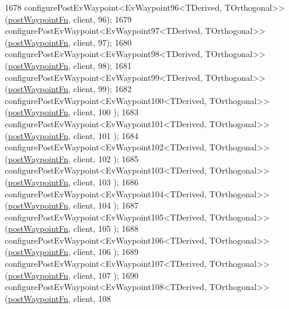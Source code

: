 \begin{DoxyCode}
1678     configurePostEvWaypoint<EvWaypoint96<TDerived, TOrthogonal>>(\hyperlink{classcl__move__base__z_1_1WaypointEventDispatcher_a964a57fcce5d48ec60243230722d8dd7}{postWaypointFn}, client, 96);
1679     configurePostEvWaypoint<EvWaypoint97<TDerived, TOrthogonal>>(\hyperlink{classcl__move__base__z_1_1WaypointEventDispatcher_a964a57fcce5d48ec60243230722d8dd7}{postWaypointFn}, client, 97);
1680     configurePostEvWaypoint<EvWaypoint98<TDerived, TOrthogonal>>(\hyperlink{classcl__move__base__z_1_1WaypointEventDispatcher_a964a57fcce5d48ec60243230722d8dd7}{postWaypointFn}, client, 98);
1681     configurePostEvWaypoint<EvWaypoint99<TDerived, TOrthogonal>>(\hyperlink{classcl__move__base__z_1_1WaypointEventDispatcher_a964a57fcce5d48ec60243230722d8dd7}{postWaypointFn}, client, 99);
1682     configurePostEvWaypoint<EvWaypoint100<TDerived, TOrthogonal>>(\hyperlink{classcl__move__base__z_1_1WaypointEventDispatcher_a964a57fcce5d48ec60243230722d8dd7}{postWaypointFn}, client, 100
      );
1683     configurePostEvWaypoint<EvWaypoint101<TDerived, TOrthogonal>>(\hyperlink{classcl__move__base__z_1_1WaypointEventDispatcher_a964a57fcce5d48ec60243230722d8dd7}{postWaypointFn}, client, 101
      );
1684     configurePostEvWaypoint<EvWaypoint102<TDerived, TOrthogonal>>(\hyperlink{classcl__move__base__z_1_1WaypointEventDispatcher_a964a57fcce5d48ec60243230722d8dd7}{postWaypointFn}, client, 102
      );
1685     configurePostEvWaypoint<EvWaypoint103<TDerived, TOrthogonal>>(\hyperlink{classcl__move__base__z_1_1WaypointEventDispatcher_a964a57fcce5d48ec60243230722d8dd7}{postWaypointFn}, client, 103
      );
1686     configurePostEvWaypoint<EvWaypoint104<TDerived, TOrthogonal>>(\hyperlink{classcl__move__base__z_1_1WaypointEventDispatcher_a964a57fcce5d48ec60243230722d8dd7}{postWaypointFn}, client, 104
      );
1687     configurePostEvWaypoint<EvWaypoint105<TDerived, TOrthogonal>>(\hyperlink{classcl__move__base__z_1_1WaypointEventDispatcher_a964a57fcce5d48ec60243230722d8dd7}{postWaypointFn}, client, 105
      );
1688     configurePostEvWaypoint<EvWaypoint106<TDerived, TOrthogonal>>(\hyperlink{classcl__move__base__z_1_1WaypointEventDispatcher_a964a57fcce5d48ec60243230722d8dd7}{postWaypointFn}, client, 106
      );
1689     configurePostEvWaypoint<EvWaypoint107<TDerived, TOrthogonal>>(\hyperlink{classcl__move__base__z_1_1WaypointEventDispatcher_a964a57fcce5d48ec60243230722d8dd7}{postWaypointFn}, client, 107
      );
1690     configurePostEvWaypoint<EvWaypoint108<TDerived, TOrthogonal>>(\hyperlink{classcl__move__base__z_1_1WaypointEventDispatcher_a964a57fcce5d48ec60243230722d8dd7}{postWaypointFn}, client, 108

\end{DoxyCode}
